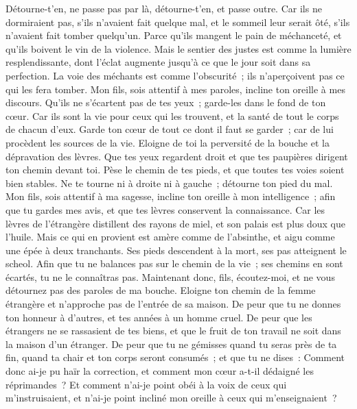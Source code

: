 \begin{multicols}{2}
Détourne-t'en, ne passe pas par là, détourne-t'en, et passe outre.
Car ils ne dormiraient pas, s'ils n'avaient fait quelque mal, et le sommeil leur serait ôté, s'ils n'avaient fait tomber quelqu'un.
Parce qu'ils mangent le pain de méchanceté, et qu'ils boivent le vin de la violence.
Mais le sentier des justes est comme la lumière resplendissante, dont l'éclat augmente jusqu'à ce que le jour soit dans sa perfection.
La voie des méchants est comme l'obscurité~; ils n'aperçoivent pas ce qui les fera tomber.
Mon fils, sois attentif à mes paroles, incline ton oreille à mes discours.
Qu'ils ne s'écartent pas de tes yeux~; garde-les dans le fond de ton cœur.
Car ils sont la vie pour ceux qui les trouvent, et la santé de tout le corps de chacun d'eux.
Garde ton cœur de tout ce dont il faut se garder~; car de lui procèdent les sources de la vie.
Eloigne de toi la perversité de la bouche et la dépravation des lèvres.
Que tes yeux regardent droit et que tes paupières dirigent ton chemin devant toi.
Pèse le chemin de tes pieds, et que toutes tes voies soient bien stables.
Ne te tourne ni à droite ni à gauche~; détourne ton pied du mal.
\VerseOne{}Mon fils, sois attentif à ma sagesse, incline ton oreille à mon intelligence~;
afin que tu gardes mes avis, et que tes lèvres conservent la connaissance.
Car les lèvres de l'étrangère distillent des rayons de miel, et son palais est plus doux que l'huile.
Mais ce qui en provient est amère comme de l'absinthe, et aigu comme une épée à deux tranchants.
Ses pieds descendent à la mort, ses pas atteignent le scheol.
Afin que tu ne balances pas sur le chemin de la vie~; ses chemins en sont écartés, tu ne le connaîtras pas.
Maintenant donc, fils, écoutez-moi, et ne vous détournez pas des paroles de ma bouche.
Eloigne ton chemin de la femme étrangère et n'approche pas de l'entrée de sa maison.
De peur que tu ne donnes ton honneur à d'autres, et tes années à un homme cruel.
De peur que les étrangers ne se rassasient de tes biens, et que le fruit de ton travail ne soit dans la maison d'un étranger.
De peur que tu ne gémisses quand tu seras près de ta fin, quand ta chair et ton corps seront consumés~;
et que tu ne dises~: Comment donc ai-je pu haïr la correction, et comment mon cœur a-t-il dédaigné les réprimandes~?
Et comment n'ai-je point obéi à la voix de ceux qui m'instruisaient, et n'ai-je point incliné mon oreille à ceux qui m'enseignaient~?

\end{multicols}
